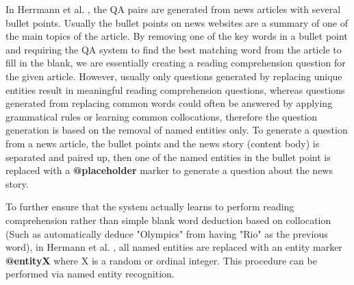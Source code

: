 \documentclass[]{article}
\begin{document}
In Herrmann et al. \cite{hermann2015teaching}, the QA pairs are generated from news articles with several bullet points. Usually the bullet points on news websites are a summary of one of the main topics of the article. By removing one of the key words in a bullet point and requiring the QA system to find the best matching word from the article to fill in the blank, we are essentially creating a reading comprehension question for the given article. However, usually only questions generated by replacing unique entities result in meaningful reading comprehension questions, whereas questions generated from replacing common words could often be answered by applying grammatical rules or learning common collocations, therefore the question generation is based on the removal of named entities only. To generate a question from a news article, the bullet points and the news story (content body) is separated and paired up, then one of the named entities in the bullet point is replaced with a \textbf{@placeholder} marker to generate a question about the news story.

To further ensure that the system actually learns to perform reading comprehension rather than simple blank word deduction based on collocation (Such as automatically deduce "Olympics" from having "Rio" as the previous word), in Hermann et al. \cite{hermann2015teaching}, all named entities are replaced with an entity marker \textbf{@entityX} where X is a random or ordinal integer. This procedure can be performed via named entity recognition.
\end{document}
